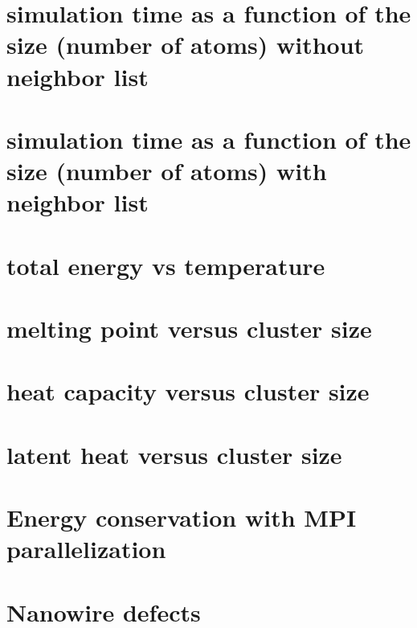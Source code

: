 \section{simulation time as a function of the size (number of atoms) without neighbor list}
\section{simulation time as a function of the size (number of atoms) with neighbor list}

\section{total energy vs temperature}
\section{melting point versus cluster size}
\section{heat capacity versus cluster size}
\section{latent heat versus cluster size}
\section{Energy conservation with MPI parallelization}
\section{Nanowire defects}